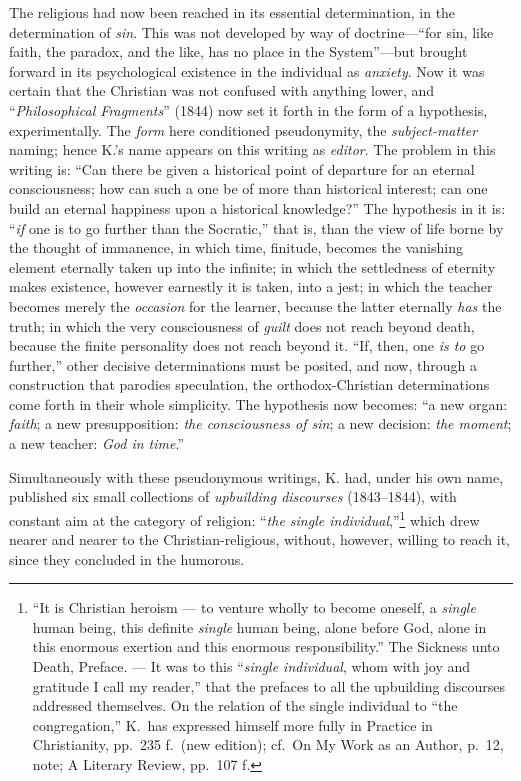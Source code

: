 \documentclass[12pt,a4paper]{article}
\begin{document}
The religious had now been reached in its essential determination, in the
determination of \emph{sin}. This was not developed by way of doctrine---``for sin, like
faith, the paradox, and the like, has no place in the System''---but brought
forward in its psychological existence in the individual as \emph{anxiety}. Now it was
certain that the Christian was not confused with anything lower, and
``\emph{Philosophical Fragments}'' (1844) now set it forth in the form of a hypothesis,
experimentally. The \emph{form} here conditioned pseudonymity, the \emph{subject-matter} naming;
hence K.'s name appears on this writing as \emph{editor}. The problem in this writing is:
``Can there be given a historical point of departure for an eternal consciousness;
how can such a one be of more than historical interest; can one build an eternal
happiness upon a historical knowledge?'' The hypothesis in it is: ``\emph{if} one is to
go further than the Socratic,'' that is, than the view of life borne by the
thought of immanence, in which time, finitude, becomes the vanishing element
eternally taken up into the infinite; in which the settledness of eternity makes
existence, however earnestly it is taken, into a jest; in which the teacher
becomes merely the \emph{occasion} for the learner, because the latter eternally \emph{has} the
truth; in which the very consciousness of \emph{guilt} does not reach beyond death,
because the finite personality does not reach beyond it. ``If, then, one \emph{is to} go
further,'' other decisive determinations must be posited, and now, through a
construction that parodies speculation, the orthodox-Christian determinations come
forth in their whole simplicity. The hypothesis now becomes: ``a new organ:
\emph{faith}; a new presupposition: \emph{the consciousness of sin}; a new decision: \emph{the moment};
a new teacher: \emph{God in time}.''

Simultaneously with these pseudonymous writings, K. had, under his own name,
published six small collections of \emph{upbuilding discourses} (1843--1844), with constant aim at the
category of religion: ``\emph{the single individual},''\footnote{``It is Christian
heroism --- to venture wholly to become oneself, a \emph{single} human being, this
definite \emph{single} human being, alone before God, alone in this enormous exertion and
this enormous responsibility.'' The Sickness unto Death, Preface. --- It was to
this ``\emph{single individual}, whom with joy and gratitude I call my reader,'' that the
prefaces to all the upbuilding discourses addressed themselves. On the relation of
the single individual to ``the congregation,'' K.\ has expressed himself more
fully in Practice in Christianity, pp.\ 235 f.\ (new edition); cf.\ On My Work as
an Author, p.\ 12, note; A Literary Review, pp.\ 107 f.} which drew nearer and
nearer to the Christian-religious, without, however, willing to reach it, since
they concluded in the humorous.
\end{document}
